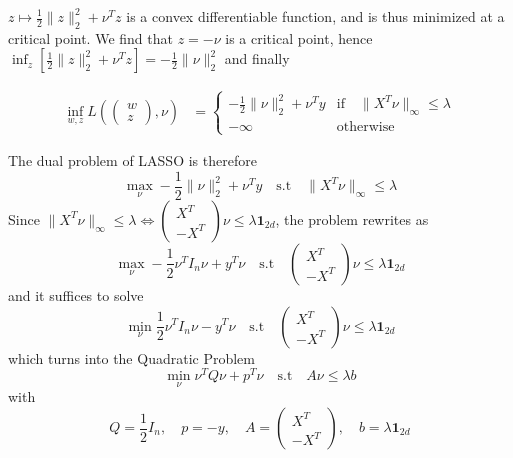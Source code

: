 \documentclass[a4paper,11pt]{article}
\begin{document}
\noindent $z\mapsto \frac 12 \|z\|_2^2 + \nu^Tz$ is a convex differentiable function, and is thus minimized at a critical point. We find that $z=-\nu$ is a critical point, hence $\inf_z \left[ \frac 12 \|z\|_2^2 + \nu^Tz \right] = -\frac 12 \|\nu\|_2^2$ and finally 

$$\begin{aligned}\inf_{w,z} L\left(\begin{pmatrix}w\\z \end{pmatrix}, \nu\right) 
&= \begin{cases} -\frac 12 \|\nu\|_2^2 + \nu^Ty &\text{if} \quad \|X^T\nu\|_{\infty} \leq \lambda \\
-\infty &\text{otherwise}
\end{cases}
\end{aligned}$$ 

\noindent The dual problem of LASSO is therefore $$\max_{\nu} -\frac 12 \|\nu\|_2^2 + \nu^Ty \quad \text{s.t} \quad \|X^T\nu\|_{\infty}\leq \lambda$$
Since $\|X^T\nu\|_{\infty}\leq \lambda \iff \begin{pmatrix}X^T \\ -X^T \end{pmatrix} \nu \leq \lambda \mathbf 1_{2d}$, the problem rewrites as 
$$\max_{\nu} -\frac 12 \nu^TI_n\nu  + y^T \nu \quad \text{s.t} \quad \begin{pmatrix}X^T \\ -X^T \end{pmatrix} \nu \leq \lambda \mathbf 1_{2d}$$ and it suffices to solve 
$$\min_{\nu} \frac 12 \nu^TI_n\nu  - y^T \nu \quad \text{s.t} \quad \begin{pmatrix}X^T \\ -X^T \end{pmatrix} \nu \leq \lambda \mathbf 1_{2d}$$
which turns into the Quadratic Problem 
$$\min_{\nu} \nu^TQ\nu  + p^T \nu \quad \text{s.t} \quad A \nu \leq \lambda b$$
with $$ Q=\frac 12 I_n, \quad p=-y, \quad A = \begin{pmatrix}X^T \\ -X^T \end{pmatrix},\quad  b=\lambda \mathbf 1_{2d}$$
\end{document}
